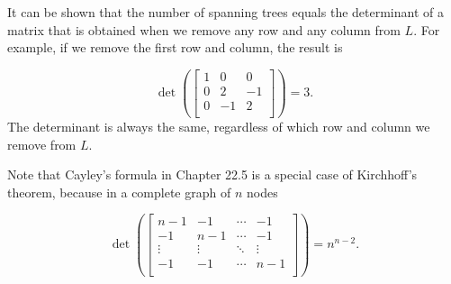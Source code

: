 It can be shown that
the number of spanning trees equals
the determinant of a matrix that is obtained
when we remove any row and any column from $L$.
For example, if we remove the first row
and column, the result is

\[ \det(
\begin{bmatrix}
  1 & 0 & 0 \\
  0 & 2 & -1 \\
  0 & -1 & 2 \\
 \end{bmatrix}
) =3.\]
The determinant is always the same,
regardless of which row and column we remove from $L$.

Note that Cayley's formula in Chapter 22.5 is
a special case of Kirchhoff's theorem,
because in a complete graph of $n$ nodes

\[ \det(
\begin{bmatrix}
  n-1 & -1 & \cdots & -1 \\
  -1 & n-1 & \cdots & -1 \\
  \vdots & \vdots & \ddots & \vdots \\
  -1 & -1 & \cdots & n-1 \\
 \end{bmatrix}
) =n^{n-2}.\]




